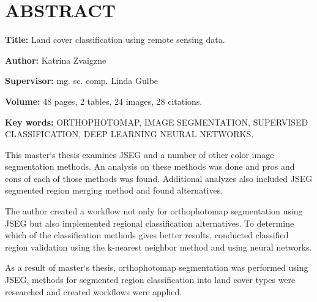 \documentclass[12pt,paper=a4]{report}
\begin{document}
\chapter*{ABSTRACT}
\textbf{Title: }Land cover classification using remote sensing data. \par
\textbf{Author: }Katrina Zvaigzne \par
\textbf{Supervisor: }mg. sc. comp. Linda Gulbe \par
\textbf{Volume: }48 pages, 2 tables, 24 images, 28 citations. \par
\textbf{Key words: }ORTHOPHOTOMAP, IMAGE SEGMENTATION, SUPERVISED CLASSIFICATION, DEEP LEARNING NEURAL NETWORKS. \\ \par
This master`s thesis examines JSEG and a number of other color image segmentation methods. An analysis on these methods was done and pros and cons of each of those methods was found. Additional analyzes also included JSEG segmented region merging method and found alternatives. \par
The author created a workflow not only for orthophotomap segmentation using JSEG but also implemented regional classification alternatives. To determine which of the classification methods gives better results, conducted classified region validation using the k-nearest neighbor method and using neural networks. \par
As a result of master`s thesis, orthophotomap segmentation was performed using JSEG, methods for segmented region classification into land cover types were researched and created workflows were applied.
\tableofcontents
\end{document}
